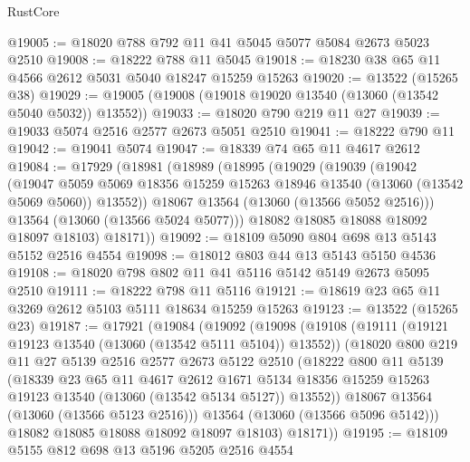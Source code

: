 \begin{lexlean}{RustCore}
\begin{coremodule}
@19005 := @18020 @788 @792 @11 @41 @5045 @5077 @5084 @2673 @5023 @2510
@19008 := @18222 @788 @11 @5045
@19018 := @18230 @38 @65 @11 @4566 @2612 @5031 @5040 @18247 @15259 @15263
@19020 := @13522 (@15265 @38)
@19029 := @19005 (@19008 (@19018 @19020 @13540 (@13060 (@13542 @5040 @5032)) @13552))
@19033 := @18020 @790 @219 @11 @27
@19039 := @19033 @5074 @2516 @2577 @2673 @5051 @2510
@19041 := @18222 @790 @11
@19042 := @19041 @5074
@19047 := @18339 @74 @65 @11 @4617 @2612
@19084 := @17929
    (@18981
      (@18989
        (@18995
          (@19029
            (@19039
              (@19042
                (@19047
                  @5059
                  @5069
                  @18356
                  @15259
                  @15263
                  @18946
                  @13540
                  (@13060 (@13542 @5069 @5060))
                  @13552))
              @18067
              @13564
              (@13060 (@13566 @5052 @2516)))
            @13564
            (@13060 (@13566 @5024 @5077)))
          @18082
          @18085
          @18088
          @18092
          @18097
          @18103)
        @18171))
@19092 := @18109 @5090 @804 @698 @13 @5143 @5152 @2516 @4554
@19098 := @18012 @803 @44 @13 @5143 @5150 @4536
@19108 := @18020 @798 @802 @11 @41 @5116 @5142 @5149 @2673 @5095 @2510
@19111 := @18222 @798 @11 @5116
@19121 := @18619 @23 @65 @11 @3269 @2612 @5103 @5111 @18634 @15259 @15263
@19123 := @13522 (@15265 @23)
@19187 := @17921
    (@19084
      (@19092
        (@19098
          (@19108
            (@19111 (@19121 @19123 @13540 (@13060 (@13542 @5111 @5104)) @13552))
            (@18020
              @800
              @219
              @11
              @27
              @5139
              @2516
              @2577
              @2673
              @5122
              @2510
              (@18222
                @800
                @11
                @5139
                (@18339
                  @23
                  @65
                  @11
                  @4617
                  @2612
                  @1671
                  @5134
                  @18356
                  @15259
                  @15263
                  @19123
                  @13540
                  (@13060 (@13542 @5134 @5127))
                  @13552))
              @18067
              @13564
              (@13060 (@13566 @5123 @2516)))
            @13564
            (@13060 (@13566 @5096 @5142)))
          @18082
          @18085
          @18088
          @18092
          @18097
          @18103)
        @18171))
@19195 := @18109 @5155 @812 @698 @13 @5196 @5205 @2516 @4554

\end{coremodule}
\end{lexlean}
